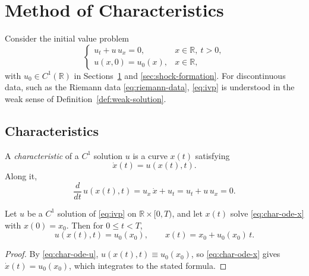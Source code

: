 
\section{Method of Characteristics}
\label{sec:characteristics}

Consider the initial value problem
\begin{equation}
  \label{eq:ivp}
  \begin{cases}
    u_t + u\, u_x = 0, & x \in \mathbb{R},\ t > 0, \\
    u(x,0) = u_0(x), & x \in \mathbb{R},
  \end{cases}
\end{equation}
with $u_0 \in C^1(\mathbb{R})$ in Sections~\ref{sec:characteristics} and
\ref{sec:shock-formation}. For discontinuous data, such as the Riemann data
\eqref{eq:riemann-data}, \eqref{eq:ivp} is understood in the weak sense of
Definition~\ref{def:weak-solution}.

\subsection{Characteristics}
\label{subsec:char-lines}

A \emph{characteristic} of a $C^1$ solution $u$ is a curve $x(t)$ satisfying
\begin{equation}
  \label{eq:char-ode-x}
  \dot{x}(t) = u(x(t), t).
\end{equation}
Along it,
\begin{equation}
  \label{eq:char-ode-u}
  \frac{d}{dt}\, u(x(t), t) = u_x\,\dot{x} + u_t = u_t + u\,u_x = 0 .
\end{equation}

\begin{proposition}
\label{prop:char-lines}
Let $u$ be a $C^1$ solution of \eqref{eq:ivp} on $\mathbb{R} \times
[0,T)$, and let $x(t)$ solve \eqref{eq:char-ode-x} with $x(0)=x_0$. Then
for $0 \le t < T$,
\begin{equation}
  \label{eq:char-formula}
  u(x(t), t) = u_0(x_0), \qquad x(t) = x_0 + u_0(x_0)\, t.
\end{equation}
\end{proposition}

\begin{proof}
By \eqref{eq:char-ode-u}, $u(x(t),t) \equiv u_0(x_0)$, so
\eqref{eq:char-ode-x} gives $\dot x(t) = u_0(x_0)$, which integrates to the
stated formula.
\end{proof}


